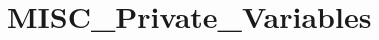 \hypertarget{group___m_i_s_c___private___variables}{\section{M\-I\-S\-C\-\_\-\-Private\-\_\-\-Variables}
\label{group___m_i_s_c___private___variables}
}
